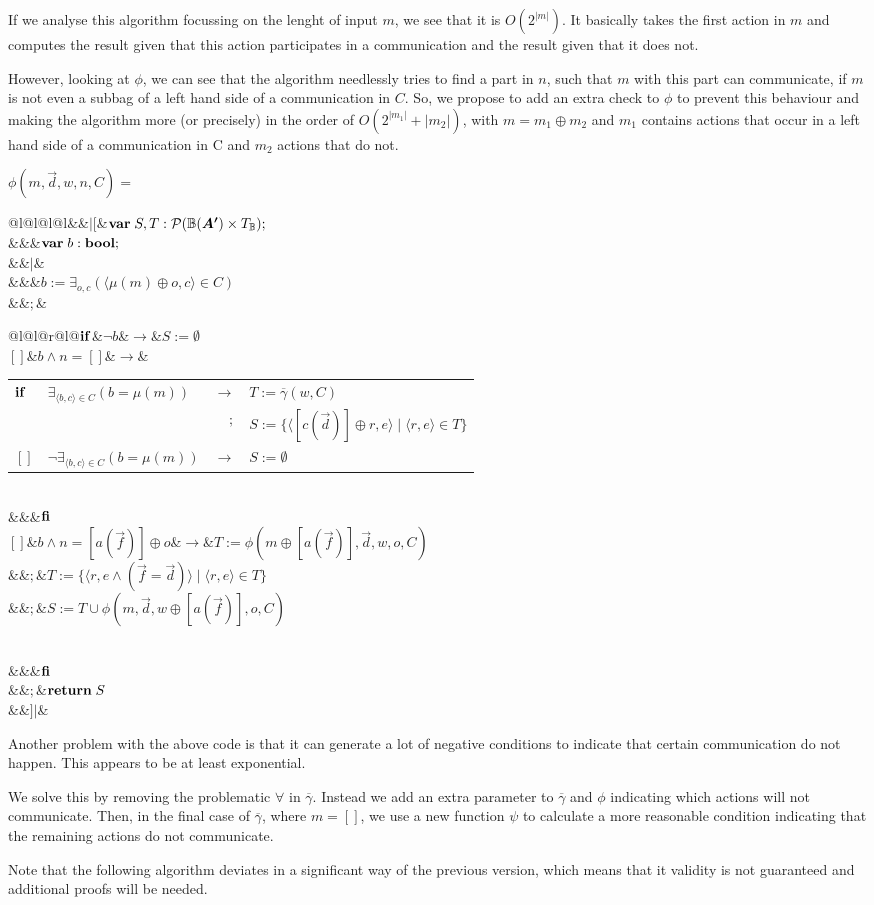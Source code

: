 \documentclass[a4paper,twoside]{article}
\makeatletter
\def\vec#1{\overrightarrow{#1}}		%
\def\mset#1{[#1]}
\def\tup#1{\langle #1\rangle}
\newenvironment{GCL}%
{\begin{trivlist}\item[]\hspace{4mm}}{\end{trivlist}}
\newcommand{\gprogvar}[2]{\begin{tabular}[t]{@{\hspace{0mm}}l@{\hspace{0mm}}l@{\hspace{0mm}}l@{\hspace{2mm}}l}&&$|[$&$#1$\\&&$|$&$#2$\\&&$]|$&\\\end{tabular}}
\newcommand{\gvar}{{\bf var}\;}
\newcommand{\gdecl}[2]{#1: #2;\;}
\newcommand{\gbool}{{\bf bool}}
\newcommand{\gnl}{$\\&&&$}
\newcommand{\gseq}{$\\&&$;$&$}
\newcommand{\gassign}[2]{#1:=#2}
\newcommand{\greturn}[1]{{\bf return}\;#1}
\newcommand{\gif}[2]{$\begin{tabular}[t]{@{\hspace{0mm}}l@{\hspace{2mm}}l@{\hspace{2mm}}r@{\hspace{2mm}}l@{\hspace{0mm}}}${\bf if}$&$#1$&$\rightarrow$&$#2$\\\end{tabular}\\&&&${\bf fi}}
\newcommand{\gifalt}[2]{$\\$[\!]$&$#1$&$\rightarrow$&$#2}
\makeatother
\begin{document}
\noindent If we analyse this algorithm focussing on the lenght of input $m$, we see that it is $O(2^{|m|})$. It basically takes the first action in $m$ and computes the result given that this action participates in a communication and the result given that it does not.

However, looking at $\phi$, we can see that the algorithm needlessly tries to find a part in $n$, such that $m$ with this part can communicate, if $m$ is not even a subbag of a left hand side of a communication in $C$. So, we propose to add an extra check to $\phi$ to prevent this behaviour and making the algorithm more (or precisely) in the order of $O(2^{|m_1|}+|m_2|)$, with $m=m_1\oplus m_2$ and $m_1$ contains actions that occur in a left hand side of a communication in C and $m_2$ actions that do not.

\begin{GCL}
$\phi(m,\vec{d},w,n,C)=$
\gprogvar{
  \gvar
  \gdecl{S,T}{\mathcal{P}(\bagmao\times T_{\mathbb{B}})}
  \gnl
  \gvar
  \gdecl{b}{\gbool}
}{
  \gnl
  \gassign{b}{\exists_{o,c}(\tup{\mu(m)\oplus o,c}\in C)}
  \gseq
  \gif{\neg b}{
    \gassign{S}{\emptyset}
  \gifalt{b\land n=\mset{}}{
    \gif{\exists_{\tup{b,c}\in C}(b=\mu(m))}{
      \gassign{T}{\overline{\gamma}(w,C)}\gseq
      \gassign{S}{\{\tup{\mset{c(\vec{d})}\oplus r,e}\;|\;\tup{r,e}\in T\}}
    \gifalt{\neg\exists_{\tup{b,c}\in C}(b=\mu(m))}{
      \gassign{S}{\emptyset}
    }}
  \gifalt{b\land n=\mset{a(\vec{f})}\oplus o}{
    \gassign{T}{\phi(m\oplus\mset{a(\vec{f})},\vec{d},w,o,C)}\gseq
    \gassign{T}{\{\tup{r,e\land(\vec{f}=\vec{d})}\;|\;\tup{r,e}\in T\}}\gseq
    \gassign{S}{T\cup\phi(m,\vec{d},w\oplus\mset{a(\vec{f})},o,C)}
  }}}\gseq
  \greturn{S}
}
\end{GCL}

\noindent 
Another problem with the above code is that it can generate a lot of negative conditions to indicate that certain communication do not happen. This appears to be at least exponential.

We solve this by removing the problematic $\forall$ in $\overline{\gamma}$. Instead we add an extra parameter to $\overline{\gamma}$ and $\phi$ indicating which actions will not communicate. Then, in the final case of $\overline{\gamma}$, where $m=\mset{}$, we use a new function $\psi$ to calculate a more reasonable condition indicating that the remaining actions do not communicate.

Note that the following algorithm deviates in a significant way of the previous version, which means that it validity is not guaranteed and additional proofs will be needed.
\end{document}

